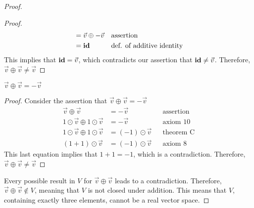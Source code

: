 \documentclass{article}
\begin{document}
\begin{proof}
\begin{enumerate}
\begin{proof}
\begin{align*}
                                                       & = \vec{v} \oplus -\vec{v}                  &  & \text{assertion}                 \\
                                                       & = \operatorname{\textbf{id}}                                      &  & \text{def. of additive identity}
            \end{align*}
            This implies that $\operatorname{\textbf{id}} = \vec{v}$, which contradicts our assertion that $\operatorname{\textbf{id}} \neq \vec{v}$. Therefore, $\vec{v} \oplus \vec{v} \neq \vec{v}$
        \end{proof}
         $\vec{v} \oplus \vec{v} = -\vec{v}$
        \begin{proof}
            Consider the assertion that $\vec{v} \oplus \vec{v} = -\vec{v}$
            \begin{align*}
                \vec{v} \oplus \vec{v}                 & = -\vec{v}           &  & \text{assertion} \\
                1 \odot \vec{v} \oplus 1 \odot \vec{v} & = -\vec{v}           &  & \text{axiom 10}  \\
                1 \odot \vec{v} \oplus 1 \odot \vec{v} & = (-1) \odot \vec{v} &  & \text{theorem C} \\
                (1+1) \odot \vec{v}                    & = (-1) \odot \vec{v} &  & \text{axiom 8}
            \end{align*}
            This last equation implies that $1+1 = -1$, which is a contradiction. Therefore, $\vec{v} \oplus \vec{v} \neq \vec{v}$
        \end{proof}
    \end{enumerate}
    Every possible result in $V$ for $\vec{v} \oplus \vec{v}$ leads to a contradiction. Therefore, $\vec{v} \oplus \vec{v} \not \in V$, meaning that $V$ is not closed under addition. This means that $V$, containing exactly three elements, cannot be a real vector space.
\end{proof}
\newpage
\end{document}
